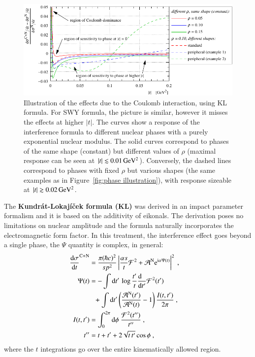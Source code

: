 \begin{figure}
\begin{center}
\includegraphics{fig/cni_effect_illustration.pdf}
\caption{%
Illustration of the effects due to the Coulomb interaction, using KL formula. For SWY formula, the picture is similar, however it misses the effects at higher $|t|$. The curves show a response of the interference formula to different nuclear phases with a purely exponential nuclear modulus. The solid curves correspond to phases of the same shape (constant) but different values of $\rho$ (maximal response can be seen at $|t| \lesssim 0.01\,{\rm GeV^2}$). Conversely, the dashed lines correspond to phases with fixed $\rho$ but various shapes (the same examples as in Figure~\ref{fig:phase illustration}), with response sizeable at $|t| \gtrsim 0.02\,{\rm GeV^2}$.
}
\label{fig:cni effect}
\end{center}
\end{figure}

The {\bf Kundr\' at-Lokaj\' i\v cek formula (KL)} \cite{kl94} was derived in an impact parameter formalism and it is based on the additivity of eikonals. The derivation poses no limitations on nuclear amplitude and the formula naturally incorporates the electromagnetic form factor. In this treatment, the interference effect goes beyond a single phase, the $\Psi$ quantity is complex, in general:
\begin{equation}
\label{eq:int kl}
	\begin{aligned}
		{\d\sigma\over \d t}^{\rm C+N} &= {\pi (\hbar c)^2 \over s p^2} \left | {\alpha s\over t} {\cal F}^2 + {\cal A}^{\rm N} \e^{\I\alpha \Psi(t)} \right |^2\ ,\cr
		\Psi(t) &= 
			- \int \d t'\, \log {t'\over t} {\d\phantom{t'}\over \d t'} {\cal F}^2(t') \cr
		&\phantom{=} + \int \d t' \left( {{\cal A}^{\rm N}(t') \over {\cal A}^{\rm N}(t)} - 1 \right) { I(t, t')\over 2\pi }
			\ ,\cr
		I(t, t') &= \int_0^{2\pi} \d\phi\ {{\cal F}^2(t'')\over t''}\ , \cr
		t'' &= t + t' + 2\sqrt{t\, t'} \cos\phi\ ,\cr
	\end{aligned}
\end{equation}
where the $t$ integrations go over the entire kinematically allowed region.

